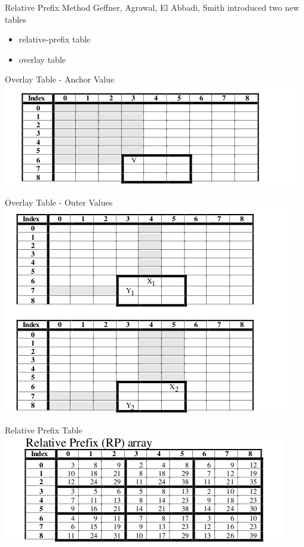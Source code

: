 \documentclass{beamer}
\theoremstyle{definition}
\theoremstyle{definition}
\begin{document}
\begin{frame}{Relative Prefix Method}
Geffner, Agrawal, El Abbadi, Smith\cite{Geffner99}
introduced two new tables
\begin{itemize}
    \item relative-prefix table
    \item overlay table
\end{itemize}
\end{frame}

\begin{frame}{Overlay Table - Anchor Value}
\includegraphics[scale=0.4]{relprefix_anchor.png}
\cite{Geffner99}
\end{frame}

\begin{frame}{Overlay Table - Outer Values}
\includegraphics[scale=0.4]{relprefix_outer.png}
\cite{Geffner99}
\end{frame}

\begin{frame}{Relative Prefix Table}
\includegraphics[scale=0.4]{relprefix_rp.png}
\cite{Geffner99}
\end{frame}
\end{document}

